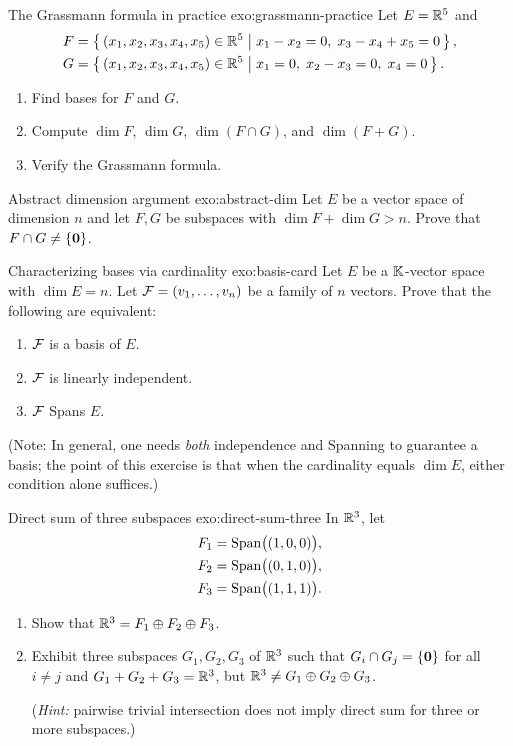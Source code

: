 \begin{exercise}{The Grassmann formula in practice \intermediate}{exo:grassmann-practice}
Let $E={\mathbb{R}}^5$ and
\begin{align*}
  F &= \left\{\,(x_1,x_2,x_3,x_4,x_5)\in{\mathbb{R}}^5\;\middle|\;x_1-x_2=0,\; x_3-x_4+x_5=0\,\right\}, \\
  G &= \left\{\,(x_1,x_2,x_3,x_4,x_5)\in{\mathbb{R}}^5\;\middle|\;x_1=0,\; x_2-x_3=0,\; x_4=0\,\right\}.
\end{align*}
\begin{enumerate}[label=(\alph*)]
  \item Find bases for $F$ and $G$.
  \item Compute $\dim F$, $\dim G$, $\dim(F\cap G)$, and $\dim(F+G)$.
  \item Verify the Grassmann formula.
\end{enumerate}
\end{exercise}

\begin{exercise}{Abstract dimension argument \intermediate}{exo:abstract-dim}
Let $E$ be a vector space of dimension $n$ and let $F,G$ be subspaces
with $\dim F + \dim G > n$. Prove that $F\cap G\neq\left\{\mathbf{0}\right\}$.
\end{exercise}

\begin{exercise}{Characterizing bases via cardinality \challenging}{exo:basis-card}
Let $E$ be a ${\mathbb{K}}$-vector space with $\dim E = n$. Let
${\mathcal{F}} = (v_1,\ldots,v_n)$ be a family of $n$ vectors. Prove that the
following are equivalent:
\begin{enumerate}[label=(\roman*)]
  \item ${\mathcal{F}}$ is a basis of $E$.
  \item ${\mathcal{F}}$ is linearly independent.
  \item ${\mathcal{F}}$ Spans $E$.
\end{enumerate}
(Note: In general, one needs \emph{both} independence and Spanning to
guarantee a basis; the point of this exercise is that when the cardinality
equals $\dim E$, either condition alone suffices.)
\end{exercise}

\begin{exercise}{Direct sum of three subspaces \challenging}{exo:direct-sum-three}
In ${\mathbb{R}}^3$, let
\begin{align*}
  F_1 &= \operatorname{Span}\bigl((1,0,0)\bigr), \\
  F_2 &= \operatorname{Span}\bigl((0,1,0)\bigr), \\
  F_3 &= \operatorname{Span}\bigl((1,1,1)\bigr).
\end{align*}
\begin{enumerate}[label=(\alph*)]
  \item Show that ${\mathbb{R}}^3 = F_1\oplus F_2\oplus F_3$.
  \item Exhibit three subspaces $G_1,G_2,G_3$ of ${\mathbb{R}}^3$ such that
    $G_i\cap G_j = \left\{\mathbf{0}\right\}$ for all $i\neq j$ and
    $G_1+G_2+G_3={\mathbb{R}}^3$, but ${\mathbb{R}}^3\neq G_1\oplus G_2\oplus G_3$.

    (\emph{Hint:} pairwise trivial intersection does not imply direct sum
    for three or more subspaces.)
\end{enumerate}
\end{exercise}

